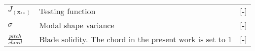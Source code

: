 \documentclass{config/polimiThesis}
\begin{document}
\begin{longtable}{p{2.5cm}p{8cm}p{2.5cm}}
    $J_{(\boldsymbol{x}_{**})}$ & Testing function & [-] \\ 
    $\sigma$ & Modal shape variance & [-] \\
    $\frac{pitch}{chord}$ & Blade solidity. The chord in the present work is set to $1$ & [-] \\ 
    \hline
\end{longtable}


\mainmatter











\end{document}

